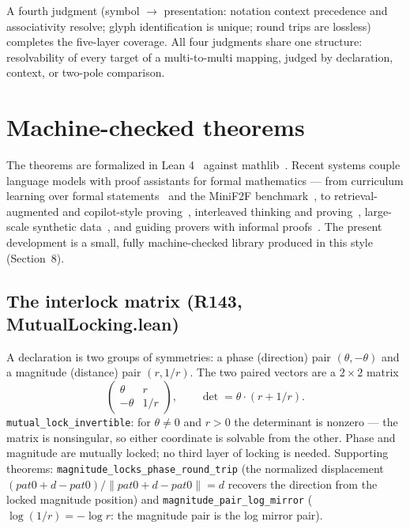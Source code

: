 \documentclass[sigplan,10pt,anonymous,review]{acmart}
\begin{document}
A fourth judgment (symbol $\to$ presentation: notation context
precedence and associativity resolve; glyph identification is unique;
round trips are lossless) completes the five-layer coverage. All four
judgments share one structure: resolvability of every target of a
multi-to-multi mapping, judged by declaration, context, or two-pole
comparison.

\section{Machine-checked theorems}

The theorems are formalized in Lean 4~\cite{lean4} against
mathlib~\cite{mathlib2020, mathlib2026}. Recent systems couple language
models with proof assistants for formal mathematics --- from
curriculum learning over formal statements~\cite{polu2022curriculum,
han2021gptf} and the MiniF2F benchmark~\cite{zheng2021minif2f}, to
retrieval-augmented and copilot-style proving~\cite{yang2023leandojo,
song2024leancopilot}, interleaved thinking and
proving~\cite{lin2024leantar}, large-scale synthetic
data~\cite{xin2024deepseekprover, azerbayev2023llemma}, and guiding
provers with informal proofs~\cite{jiang2022draftsketch}. The present
development is a small, fully machine-checked library produced in this
style (Section~8).

\subsection{The interlock matrix (R143, MutualLocking.lean)}

A declaration is two groups of symmetries: a phase (direction) pair
$(\theta, -\theta)$ and a magnitude (distance) pair $(r, 1/r)$. The
two paired vectors are a $2 \times 2$ matrix
\[
  \begin{pmatrix} \theta & r \\ -\theta & 1/r \end{pmatrix},
  \qquad \det = \theta \cdot (r + 1/r).
\]
\verb|mutual_lock_invertible|: for $\theta \neq 0$ and $r > 0$ the
determinant is nonzero --- the matrix is nonsingular, so either
coordinate is solvable from the other. Phase and magnitude are mutually
locked; no third layer of locking is needed. Supporting theorems:
\verb|magnitude_locks_phase_round_trip| (the normalized displacement
$(pat0 + d - pat0)/\|pat0 + d - pat0\| = d$ recovers the direction
from the locked magnitude position) and \verb|magnitude_pair_log_mirror|
($\log(1/r) = -\log r$: the magnitude pair is the log mirror pair).
\end{document}
